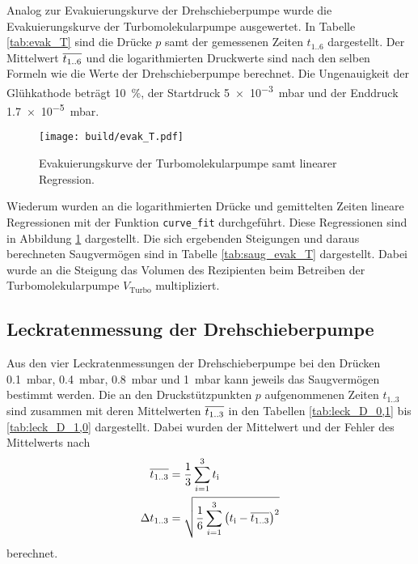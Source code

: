 Analog zur Evakuierungskurve der Drehschieberpumpe wurde die Evakuierungskurve
der Turbomolekularpumpe ausgewertet. In Tabelle \ref{tab:evak_T} sind die
Drücke $p$ samt der gemessenen Zeiten $t_\text{1..6}$
dargestellt. Der Mittelwert $\overline{t_\text{1..6}}$ und die logarithmierten
Druckwerte sind nach den selben Formeln wie die Werte der Drehschieberpumpe
berechnet. Die Ungenauigkeit der Glühkathode beträgt \SI{10}{\percent}, der
Startdruck \SI{5e-3}{\milli\bar} und der Enddruck
\SI{1.7e-5}{\milli\bar}.



\begin{figure}
  \centering
  \texttt{[image: build/evak\_T.pdf]}
  \caption{Evakuierungskurve der Turbomolekularpumpe samt linearer Regression.}
  \label{fig:evak_T}
\end{figure}

Wiederum wurden an die logarithmierten Drücke und gemittelten Zeiten
lineare Regressionen mit der Funktion \texttt{curve\_fit} durchgeführt.
Diese Regressionen sind in Abbildung \ref{fig:evak_T} dargestellt.
Die sich ergebenden Steigungen und daraus berechneten Saugvermögen sind in
Tabelle \ref{tab:saug_evak_T} dargestellt. Dabei wurde an die Steigung das
Volumen des Rezipienten beim Betreiben der Turbomolekularpumpe $V_\text{Turbo}$
multipliziert.




\subsection{Leckratenmessung der Drehschieberpumpe}
\label{sec:AuswLeckD}

Aus den vier Leckratenmessungen der Drehschieberpumpe
bei den Drücken \SI{0.1}{\milli\bar},
\SI{0.4}{\milli\bar}, \SI{0.8}{\milli\bar} und \SI{1}{\milli\bar}
kann jeweils das Saugvermögen bestimmt werden.
Die an den Druckstützpunkten $p$ aufgenommenen
Zeiten $t_\text{1..3}$ sind zusammen mit deren Mittelwerten $\overline{t_\text{1..3}}$
in den Tabellen \ref{tab:leck_D_0,1} bis \ref{tab:leck_D_1,0} dargestellt.
Dabei wurden der Mittelwert und der Fehler des Mittelwerts nach
\begin{align*}
  \overline{t_\text{1..3}} &= \frac{1}{3} \sum_{i = 1}^3 t_\text{i} \\
  \Delta t_\text{1..3} &=
  \sqrt{\frac{1}{6} \sum_{i = 1}^3 \left(t_\text{i} - \overline{t_\text{1..3}}\right)^2}
\end{align*}
berechnet.

